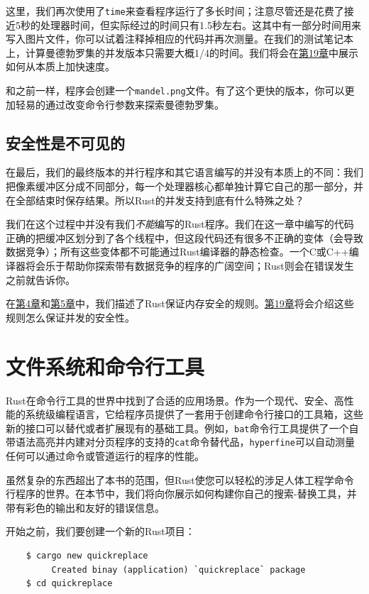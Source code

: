 这里，我们再次使用了\texttt{time}来查看程序运行了多长时间；注意尽管还是花费了接近5秒的处理器时间，但实际经过的时间只有1.5秒左右。这其中有一部分时间用来写入图片文件，你可以试着注释掉相应的代码并再次测量。在我们的测试笔记本上，计算曼德勃罗集的并发版本只需要大概1/4的时间。我们将会在\hyperref[ch19]{第19章}中展示如何从本质上加快速度。

和之前一样，程序会创建一个\texttt{mandel.png}文件。有了这个更快的版本，你可以更加轻易的通过改变命令行参数来探索曼德勃罗集。

\subsection{安全性是不可见的}

在最后，我们的最终版本的并行程序和其它语言编写的并没有本质上的不同：我们把像素缓冲区分成不同部分，每一个处理器核心都单独计算它自己的那一部分，并在全部结束时保存结果。所以Rust的并发支持到底有什么特殊之处？

我们在这个过程中并没有我们\emph{不能}编写的Rust程序。我们在这一章中编写的代码正确的把缓冲区划分到了各个线程中，但这段代码还有很多不正确的变体（会导致数据竞争）；所有这些变体都不可能通过Rust编译器的静态检查。一个C或C++编译器将会乐于帮助你探索带有数据竞争的程序的广阔空间；Rust则会在错误发生之前就告诉你。

在\hyperref[ch04]{第4章}和\hyperref[ch05]{第5章}中，我们描述了Rust保证内存安全的规则。\hyperref[ch19]{第19章}将会介绍这些规则怎么保证并发的安全性。

\section{文件系统和命令行工具}
Rust在命令行工具的世界中找到了合适的应用场景。作为一个现代、安全、高性能的系统级编程语言，它给程序员提供了一套用于创建命令行接口的工具箱，这些新的接口可以替代或者扩展现有的基础工具。例如，\texttt{bat}命令行工具提供了一个自带语法高亮并内建对分页程序的支持的\texttt{cat}命令替代品，\texttt{hyperfine}可以自动测量任何可以通过命令或管道运行的程序的性能。

虽然复杂的东西超出了本书的范围，但Rust使您可以轻松的涉足人体工程学命令行程序的世界。在本节中，我们将向你展示如何构建你自己的搜索-替换工具，并带有彩色的输出和友好的错误信息。

开始之前，我们要创建一个新的Rust项目：
\begin{verbatim}
    $ cargo new quickreplace
         Created binay (application) `quickreplace` package
    $ cd quickreplace
\end{verbatim}

